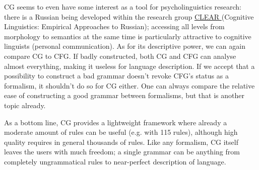 CG seems to even have some interest as a tool for psycholinguistics research:
there is a Russian being developed within the research group
 \href{https://uit.no/forskning/forskningsgrupper/gruppe?p_document_id=344365}{CLEAR
} (Cognitive Linguistics: Empirical Approaches to Russian); accessing
all levels from morphology to semantics at the same time is particularly attractive to cognitive linguists (personal communication).
As for its descriptive power, we can again compare CG to CFG. If
badly constructed, both CG and CFG can analyse almost everything,
making it useless for language description. If we accept that a
possibility to construct a bad grammar doesn't revoke CFG's status as
a formalism, it shouldn't do so for CG either. One can always compare
the relative ease of constructing a good grammar between formalisms,
but that is another topic already.

As a bottom line, CG provides a lightweight framework where already a
moderate amount of rules can be useful (e.g. \cite{lene_trond2011} with 115
rules), although high quality requires in general thousands of rules.
Like any formalism, CG itself leaves the users with much freedom; a
single grammar can be anything from completely ungrammatical rules to near-perfect description of language.






